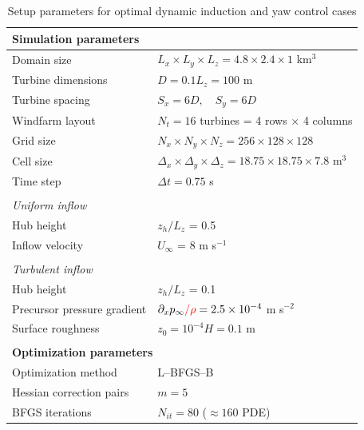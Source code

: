 \documentclass[energies,article,submit,moreauthors,latex,10pt,a4paper]{mdpi}
\newcommand{\revision}[1]{{\color{red} #1}}
\begin{document}
\begin{table}
	\caption{Setup parameters for optimal dynamic induction and yaw control cases \label{tab:case_definition}}
	\centering
	\begin{tabular}{llccc}
		\toprule
		\multicolumn{5}{l}{\textbf{Simulation parameters}}\\
		\midrule
		Domain size  			& \multicolumn{4}{l}{$L_x \times L_y \times L_z = 4.8 \times 2.4 \times 1$ km$^3$}  \\ 
		Turbine dimensions  		& \multicolumn{4}{l}{$D = 0.1L_z = 100$ m}\\ 
		Turbine spacing  		& \multicolumn{4}{l}{$S_x = 6D, \quad S_y = 6D$}\\
		Windfarm layout 		& \multicolumn{4}{l}{$N_t = 16 $ turbines = 4 rows $\times$ 4 columns} \\ 
		Grid size 			& \multicolumn{4}{l}{$N_x \times N_y \times N_z = 256 \times 128 \times 128$}\\
		Cell size 			& \multicolumn{4}{l}{$\Delta_x \times \Delta_y \times \Delta_z = 18.75 \times 18.75 \times 7.8$ m$^3$}\\
		Time step 			& \multicolumn{4}{l}{$\Delta t = 0.75$ s}\\		
		& & & & \\	
		\multicolumn{5}{l}{\textit{Uniform inflow}}\\
		Hub height & \multicolumn{4}{l}{$z_h/L_z$ = 0.5}\\
		Inflow velocity & \multicolumn{4}{l}{$U_\infty$ = 8 m s$^{-1}$}\\
		& & & & \\			
		\multicolumn{5}{l}{\textit{Turbulent inflow}}\\
		Hub height & \multicolumn{4}{l}{$z_h/L_z$ = 0.1}\\		
		Precursor pressure gradient  	& \multicolumn{4}{l}{$ \partial_x p_\infty \revision{/\rho} = 2.5 \times 10^{-4}$ m s$^{-2}$}  \\ 
		Surface roughness  &  \multicolumn{4}{l}{$z_0 = 10^{-4}H = 0.1$ m}\\ 		
		& & & & \\	
		\toprule
		\multicolumn{5}{l}{\textbf{Optimization parameters}}\\
		\midrule
		Optimization method		& \multicolumn{4}{l}{L--BFGS--B} \\
		Hessian correction pairs	& \multicolumn{4}{l}{$m = 5$} \\
		BFGS iterations 		& \multicolumn{4}{l}{$N_{it} = 80$ ($\approx 160$ PDE)} \\

\end{tabular}
\end{table}
\end{document}
